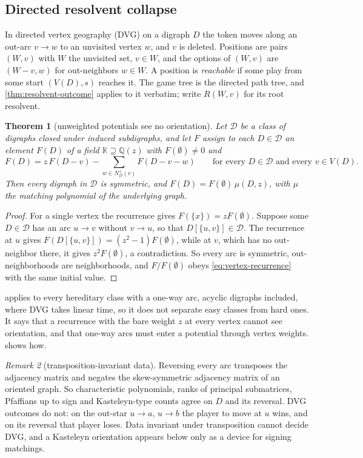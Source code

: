 \documentclass[11pt]{amsart}
\theoremstyle{plain}
\newtheorem{theorem}{Theorem}[section]
\theoremstyle{definition}
\theoremstyle{remark}
\newtheorem{remark}[theorem]{Remark}
\numberwithin{equation}{section}
\newcommand{\QQ}{\mathbb{Q}}
\newcommand{\Qz}{\QQ(z)}
\newcommand{\nplus}{N^{+}}
\begin{document}
\subsection{Directed resolvent collapse}\label{ssec:directed}
In directed vertex geography (DVG) on a digraph $D$ the token moves along an out-arc $v\to w$ to an unvisited vertex $w$, and $v$ is deleted. Positions are pairs $(W,v)$ with $W$ the unvisited set, $v\in W$, and the options of $(W,v)$ are $(W-v,w)$ for out-neighbors $w\in W$. A position is \emph{reachable} if some play from some start $(V(D),s)$ reaches it. The game tree is the directed path tree, and \cref{thm:resolvent-outcome} applies to it verbatim; write $R(W,v)$ for its root resolvent.

\begin{theorem}[unweighted potentials see no orientation]\label{thm:unweighted}
Let $\mathcal D$ be a class of digraphs closed under induced subdigraphs, and let $F$ assign to each $D\in\mathcal D$ an element $F(D)$ of a field $\mathbb K\supseteq\Qz$ with $F(\emptyset)\ne0$ and
\[
F(D)=z\,F(D-v)-\sum_{w\in\nplus_D(v)}F(D-v-w)\qquad\text{for every }D\in\mathcal D\text{ and every }v\in V(D).
\]
Then every digraph in $\mathcal D$ is symmetric, and $F(D)=F(\emptyset)\,\mu(D,z)$, with $\mu$ the matching polynomial of the underlying graph.
\end{theorem}
\begin{proof}
For a single vertex the recurrence gives $F(\{x\})=zF(\emptyset)$. Suppose some $D\in\mathcal D$ has an arc $u\to v$ without $v\to u$, so that $D[\{u,v\}]\in\mathcal D$. The recurrence at $u$ gives $F(D[\{u,v\}])=(z^2-1)F(\emptyset)$, while at $v$, which has no out-neighbor there, it gives $z^2F(\emptyset)$, a contradiction. So every arc is symmetric, out-neighborhoods are neighborhoods, and $F/F(\emptyset)$ obeys \eqref{eq:vertex-recurrence} with the same initial value.
\end{proof}

 applies to every hereditary class with a one-way arc, acyclic digraphs included, where DVG takes linear time, so it does not separate easy classes from hard ones. It says that a recurrence with the bare weight $z$ at every vertex cannot see orientation, and that one-way arcs must enter a potential through vertex weights.  shows how.

\begin{remark}[transposition-invariant data]\label{rem:transposition}
Reversing every arc transposes the adjacency matrix and negates the skew-symmetric adjacency matrix of an oriented graph. So characteristic polynomials, ranks of principal submatrices, Pfaffians up to sign and Kasteleyn-type counts agree on $D$ and its reversal. DVG outcomes do not: on the out-star $u\to a$, $u\to b$ the player to move at $u$ wins, and on its reversal that player loses. Data invariant under transposition cannot decide DVG, and a Kasteleyn orientation appears below only as a device for signing matchings.
\end{remark}
\end{document}
